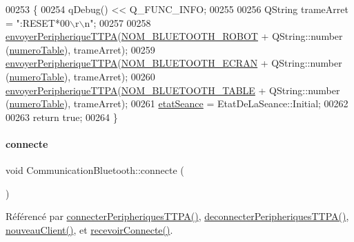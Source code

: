 \begin{DoxyCode}
00253 \{
00254     qDebug() << Q\_FUNC\_INFO;
00255 
00256     QString trameArret = \textcolor{stringliteral}{":RESET*00\(\backslash\)r\(\backslash\)n"};
00257 
00258     \hyperlink{class_communication_bluetooth_a73d95b841bf64a4463760435a41fc219}{envoyerPeripheriqueTTPA}(\hyperlink{terminal-_t_t_p_a_2communicationbluetooth_8h_a47332bb9b30ed8b0f38fa7b5bd11fd47}{NOM\_BLUETOOTH\_ROBOT} + QString::number
      (\hyperlink{class_communication_bluetooth_a9428f8261f0cc055e9c6fed9a61cb595}{numeroTable}), trameArret);
00259     \hyperlink{class_communication_bluetooth_a73d95b841bf64a4463760435a41fc219}{envoyerPeripheriqueTTPA}(\hyperlink{terminal-_t_t_p_a_2communicationbluetooth_8h_a2bd8beaaf0c4b59979a3f78d4c134ec8}{NOM\_BLUETOOTH\_ECRAN} + QString::number
      (\hyperlink{class_communication_bluetooth_a9428f8261f0cc055e9c6fed9a61cb595}{numeroTable}), trameArret);
00260     \hyperlink{class_communication_bluetooth_a73d95b841bf64a4463760435a41fc219}{envoyerPeripheriqueTTPA}(\hyperlink{terminal-_t_t_p_a_2communicationbluetooth_8h_aa416b2be7573de0d7832248a27ba09a8}{NOM\_BLUETOOTH\_TABLE} + QString::number
      (\hyperlink{class_communication_bluetooth_a9428f8261f0cc055e9c6fed9a61cb595}{numeroTable}), trameArret);
00261     \hyperlink{class_communication_bluetooth_adc66f3034d46f3964a26b62ad98e784f}{etatSeance} = EtatDeLaSeance::Initial;
00262 
00263     \textcolor{keywordflow}{return} \textcolor{keyword}{true};
00264 \}
\end{DoxyCode}
\mbox{\label{class_communication_bluetooth_a76f44488775d68071d43b418a7a1c75e}} 
\paragraph{\texorpdfstring{connecte}{connecte}\hspace{0.1cm}{\footnotesize\ttfamily [1/2]}}
{\footnotesize\ttfamily void Communication\+Bluetooth\+::connecte (\begin{DoxyParamCaption}{ }\end{DoxyParamCaption})\hspace{0.3cm}{\ttfamily [signal]}}



Référencé par \hyperlink{class_communication_bluetooth_a321073d9dc26aad4b34ecf41a1dee8a4}{connecter\+Peripheriques\+T\+T\+P\+A()}, \hyperlink{class_communication_bluetooth_aacfffa47d72f3ab5ab554001d5f38fd1}{deconnecter\+Peripheriques\+T\+T\+P\+A()}, \hyperlink{class_communication_bluetooth_ab88c9bb8a1bd2c68e3d14fc3615be888}{nouveau\+Client()}, et \hyperlink{class_communication_bluetooth_aee7edc20fc1fdfd5a5a1c228c1319531}{recevoir\+Connecte()}.

